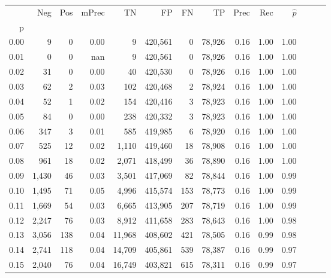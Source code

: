 \begin{tabular}{rrrrrrrrrrrrrr}
\toprule
{} &     Neg &    Pos & mPrec &       TN &       FP &      FN &      TP &  Prec &   Rec & $\hat{p}$ \\
p    &         &        &       &          &          &         &         &       &       &           \\
\midrule
0.00 &       9 &      0 &  0.00 &        9 &  420,561 &       0 &  78,926 &  0.16 &  1.00 &      1.00 \\
0.01 &       0 &      0 &   nan &        9 &  420,561 &       0 &  78,926 &  0.16 &  1.00 &      1.00 \\
0.02 &      31 &      0 &  0.00 &       40 &  420,530 &       0 &  78,926 &  0.16 &  1.00 &      1.00 \\
0.03 &      62 &      2 &  0.03 &      102 &  420,468 &       2 &  78,924 &  0.16 &  1.00 &      1.00 \\
0.04 &      52 &      1 &  0.02 &      154 &  420,416 &       3 &  78,923 &  0.16 &  1.00 &      1.00 \\
0.05 &      84 &      0 &  0.00 &      238 &  420,332 &       3 &  78,923 &  0.16 &  1.00 &      1.00 \\
0.06 &     347 &      3 &  0.01 &      585 &  419,985 &       6 &  78,920 &  0.16 &  1.00 &      1.00 \\
0.07 &     525 &     12 &  0.02 &    1,110 &  419,460 &      18 &  78,908 &  0.16 &  1.00 &      1.00 \\
0.08 &     961 &     18 &  0.02 &    2,071 &  418,499 &      36 &  78,890 &  0.16 &  1.00 &      1.00 \\
0.09 &   1,430 &     46 &  0.03 &    3,501 &  417,069 &      82 &  78,844 &  0.16 &  1.00 &      0.99 \\
0.10 &   1,495 &     71 &  0.05 &    4,996 &  415,574 &     153 &  78,773 &  0.16 &  1.00 &      0.99 \\
0.11 &   1,669 &     54 &  0.03 &    6,665 &  413,905 &     207 &  78,719 &  0.16 &  1.00 &      0.99 \\
0.12 &   2,247 &     76 &  0.03 &    8,912 &  411,658 &     283 &  78,643 &  0.16 &  1.00 &      0.98 \\
0.13 &   3,056 &    138 &  0.04 &   11,968 &  408,602 &     421 &  78,505 &  0.16 &  0.99 &      0.98 \\
0.14 &   2,741 &    118 &  0.04 &   14,709 &  405,861 &     539 &  78,387 &  0.16 &  0.99 &      0.97 \\
0.15 &   2,040 &     76 &  0.04 &   16,749 &  403,821 &     615 &  78,311 &  0.16 &  0.99 &      0.97 \\

\end{tabular}
